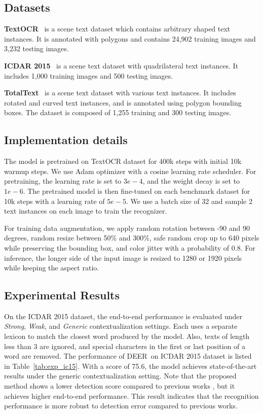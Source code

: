 \documentclass[10pt,twocolumn,letterpaper]{article}
\newcommand{\Table}[1]{Table~\ref{tab:#1}}
\newcommand{\methodname}[0]{DEER}
\begin{document}
\subsection{Datasets}

\noindent\textbf{TextOCR}~\cite{singh2021textocr} is a scene text dataset which contains arbitrary shaped text instances. It is annotated with polygons and contains 24,902 training images and 3,232 testing images.

\noindent\textbf{ICDAR 2015}~\cite{IC15} is a scene text dataset with quadrilateral text instances. It includes 1,000 training images and 500 testing images.

\noindent\textbf{TotalText}~\cite{ch2017total} is a scene text dataset with various text instances. It includes rotated and curved text instances, and is annotated using polygon bounding boxes. The dataset is composed of 1,255 training and 300 testing images.

\subsection{Implementation details}
The model is pretrained on TextOCR dataset for 400k steps with initial 10k warmup steps. We use Adam optimizer with a cosine learning rate scheduler. For pretraining, the learning rate is set to \(3e-4\), and the weight decay is set to \(1e-6\).  The pretrained model is then fine-tuned on each benchmark dataset for 10k steps with a learning rate of \(5e-5\). We use a batch size of 32 and sample 2 text instances on each image to train the recognizer.



For training data augmentation, we apply random rotation between -90 and 90 degrees, random resize between 50\%  and 300\%, safe random crop up to 640 pixels while preserving the bounding box, and color jitter with a probability of 0.8. For inference, the longer side of the input image is resized to 1280 or 1920 pixels while keeping the aspect ratio.




\subsection{Experimental Results}

On the ICDAR 2015 dataset, the end-to-end performance is evaluated under \textit{Strong}, \textit{Weak}, and \textit{Generic} contextualization settings. Each uses a separate lexicon to match the closest word produced by the model. Also, texts of length less than 3 are ignored, and special characters in the first or last position of a word are removed. The performance of \methodname~on ICDAR 2015 dataset is listed in \Table{exp_ic15}. With a score of 75.6, the model achieves state-of-the-art results under the generic contextualization setting. Note that the proposed method shows a lower detection score compared to previous works \cite{wang2021towards,xing2019convolutional}, but it achieves higher end-to-end performance. This result indicates that the recognition performance is more robust to detection error compared to previous works.
\end{document}
